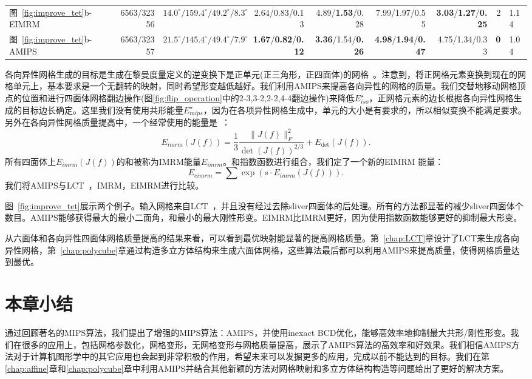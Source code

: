 \begin{table}[t]
{\begin{tabular}{lrrrrrrrl}
图~\ref{fig:improve_tet}b-EIMRM         & 6563/32356 & $14.0^\circ/159.4^\circ/49.2^\circ/8.3^\circ$  &2.64/0.83/0.13& 4.89/\textbf{1.53}/0.28 & 7.99/1.97/0.55 & \textbf{3.03}/\textbf{1.27}/\textbf{0.25}  & 2    & 1.14\\
图~\ref{fig:improve_tet}b-AMIPS 	    &6563/32357 & $\mathbf{21.5^\circ}/\mathbf{145.4^\circ}/\mathbf{49.4^\circ}/\mathbf{7.9^\circ}$  &\textbf{1.67}/\textbf{0.82}/\textbf{0.12} &\textbf{3.36}/1.54/\textbf{0.26} & \textbf{4.98}/\textbf{1.94}/\textbf{0.47} & 4.75/1.34/0.33 &\textbf{0}	& 1.04  \\
\bottomrule
\end{tabular}}
\label{table:tetmesh_stat}
\vspace{-4mm}
\end{table}

各向异性网格生成的目标是生成在黎曼度量定义的逆变换下是正单元(正三角形，正四面体)的网格~\cite{Fu2014}。注意到，将正网格元素变换到现在的网格单元上，基本要求是一个无翻转的映射，同时希望形变越低越好。我们利用AMIPS来提高各向异性的网格的质量。我们交替地移动网格顶点的位置和进行四面体网格翻边操作(图\ref{fig:flip_operation}中的2-3,3-2,2-2,4-4翻边操作)来降低$E_{iso}^{\star}$，正网格元素的边长根据各向异性网格生成的目标边长确定。这里我们没有使用共形能量$E_{mips}^{\star}$，因为在各项异性网格生成中，单元的大小是有要求的，所以相似变换不能满足要求。另外在各向异性网格质量提高中，一个经常使用的能量是~\cite{Jiao2011}：
$$E_{imrm}(J(f))= \frac{1}{3}\frac{\| J(f) \|^2_{F}}{\det(J(f))^{2/3}}+E_{\det}(J(f)).$$
所有四面体上$E_{imrm}(J(f))$的和被称为IMRM能量$E_{imrm}$。和指数函数进行组合，我们定了一个新的EIMRM 能量：
$$E_{eimrm}=\sum \exp({s \cdot E_{imrm}(J(f))}).$$
我们将AMIPS与LCT~\cite{Fu2014}，IMRM，EIMRM进行比较。

图~\ref{fig:improve_tet}展示两个例子。输入网格来自LCT~\cite{Fu2014}，并且没有经过去除sliver四面体的后处理。所有的方法都显著的减少sliver四面体个数目。AMIPS能够获得最大的最小二面角，和最小的最大刚性形变。EIMRM比IMRM更好，因为使用指数函数能够更好的抑制最大形变。

从六面体和各向异性四面体网格质量提高的结果来看，可以看到最优映射能显著的提高网格质量。第~\ref{chap:LCT}章设计了LCT来生成各向异性网格，第~\ref{chap:polycube}章通过构造多立方体结构来生成六面体网格，这些算法最后都可以利用AMIPS来提高质量，使得网格质量达到最优。

\section{本章小结}
通过回顾著名的MIPS算法，我们提出了增强的MIPS算法：AMIPS，并使用inexact BCD优化，能够高效率地抑制最大共形/刚性形变。我们在很多的应用上，包括网格参数化，网格变形，无网格变形与网格质量提高，展示了AMIPS算法的高效率和好效果。我们相信AMIPS方法对于计算机图形学中的其它应用也会起到非常积极的作用，希望未来可以发掘更多的应用，完成以前不能达到的目标。我们在第\ref{chap:affine}章和\ref{chap:polycube}章中利用AMIPS并结合其他新颖的方法对网格映射和多立方体结构构造等问题给出了更好的解决方案。

